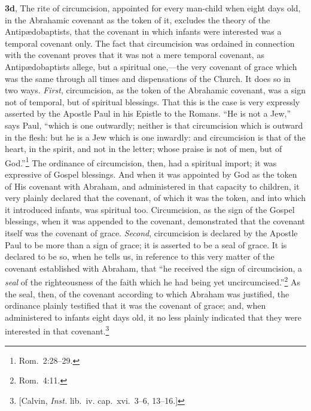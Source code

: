 \documentclass[
]{book}
\begin{document}
\textbf{3d}, The rite of circumcision, appointed for every man-child when eight days old, in the Abrahamic covenant as the token of it, excludes the theory of the Antipædobaptists, that the covenant in which infants were interested was a temporal covenant only. The fact that circumcision was ordained in connection with the covenant proves that it was not a mere temporal covenant, as Antipædobaptists allege, but a spiritual one,---the very covenant of grace which was the same through all times and dispensations of the Church. It does so in two ways. \emph{First}, circumcision, as the token of the Abrahamic covenant, was a sign not of temporal, but of spiritual blessings. That this is the case is very expressly asserted by the Apostle Paul in his Epistle to the Romans. ``He is not a Jew,'' says Paul, ``which is one outwardly; neither is that circumcision which is outward in the flesh: but he is a Jew which is one inwardly: and circumcision is that of the heart, in the spirit, and not in the letter; whose praise is not of men, but of God.''\footnote{Rom.~2:28--29.} The ordinance of circumcision, then, had a spiritual import; it was expressive of Gospel blessings. And when it was appointed by God as the token of His covenant with Abraham, and administered in that capacity to children, it very plainly declared that the covenant, of which it was the token, and into which it introduced infants, was spiritual too. Circumcision, as the sign of the Gospel blessings, when it was appended to the covenant, demonstrated that the covenant itself was the covenant of grace. \emph{Second}, circumcision is declared by the Apostle Paul to be more than a sign of grace; it is asserted to be a seal of grace. It is declared to be so, when he tells us, in reference to this very matter of the covenant established with Abraham, that ``he received the sign of circumcision, a \emph{seal} of the righteousness of the faith which he had being yet uncircumcised.''\footnote{Rom.~4:11.} As the seal, then, of the covenant according to which Abraham was justified, the ordinance plainly testified that it was the covenant of grace; and, when administered to infants eight days old, it no less plainly indicated that they were interested in that covenant.\footnote{{[}Calvin, \emph{Inst.} lib.~iv. cap.~xvi.~3--6, 13--16.{]}}
\end{document}
